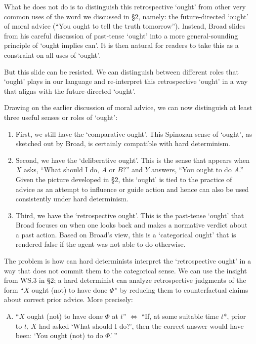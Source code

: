What he does not do is to distinguish this retrospective `ought' from
other very common uses of the word we discussed in §2, namely: the
future-directed `ought' of moral advice (``You ought to tell the truth
tomorrow''). Instead, Broad slides from his careful discussion of
past-tense `ought' into a more general-sounding principle of `ought
implies can'. It is then natural for readers to take this as a
constraint on all uses of `ought'.

But this slide can be resisted. We can distinguish between different
roles that `ought' plays in our language and re-interpret this
retrospective `ought' in a way that aligns with the future-directed
`ought'.

Drawing on the earlier discussion of moral advice, we can now
distinguish at least three useful senses or roles of `ought':

\vspace{-1em}
\begin{enumerate}
\renewcommand{\labelenumi}{(\roman{enumi})}
\item
First, we still have the `comparative ought'. This Spinozan sense of
`ought', as sketched out by Broad, is certainly compatible with hard
determinism.

\item 
Second, we have the `deliberative ought'. This is the sense that
appears when $X$ asks, ``What should I do, $A$ or $B$?'' and $Y$ answers, ``You
ought to do $A$.'' Given the picture developed in §2, this `ought' is tied
to the practice of advice as an attempt to influence or guide action and
hence can also be used consistently under hard determinism.

\item 
Third, we have the `retrospective ought'. This is the past-tense
`ought' that Broad focuses on when one looks back and makes a normative
verdict about a past action. Based on Broad's view, this is a
`categorical ought' that is rendered false if the agent was not able to
do otherwise.
\end{enumerate}

\noindent The problem is how can hard determinists interpret the `retrospective
ought' in a way that does not commit them to the categorical sense. We
can use the insight from WS.3 in §2; a hard determinist can analyze
retrospective judgments of the form ``$X$ ought (not) to have done $\Phi$'' by
reducing them to counterfactual claims about correct prior advice. More
precisely:

\vspace{-1em}
\begin{enumerate}[(R)]
\item 
    ``$X$ ought (not) to have done $\Phi$ at $t$'' $\Leftrightarrow$ ``If, at some suitable time
$t$*, prior to $t$, $X$ had asked `What should I do?', then the correct answer
would have been: `You ought (not) to do $\Phi$.'\,''
\end{enumerate}

